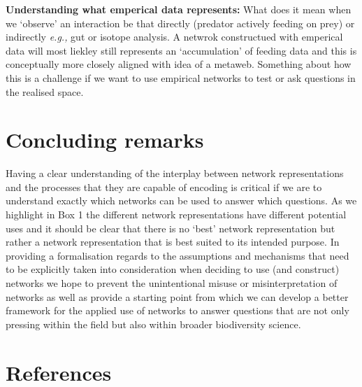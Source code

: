 \documentclass[
]{article}
\begin{document}
\textbf{Understanding what emperical data represents:} What does it mean
when we `observe' an interaction be that directly (predator actively
feeding on prey) or indirectly \emph{e.g.,} gut or isotope analysis. A
netwrok constructued with emperical data will most liekley still
represents an `accumulation' of feeding data and this is conceptually
more closely aligned with idea of a metaweb. Something about how this is
a challenge if we want to use empirical networks to test or ask
questions in the realised space.

\section{Concluding remarks}\label{concluding-remarks}

Having a clear understanding of the interplay between network
representations and the processes that they are capable of encoding is
critical if we are to understand exactly which networks can be used to
answer which questions. As we highlight in Box 1 the different network
representations have different potential uses and it should be clear
that there is no `best' network representation but rather a network
representation that is best suited to its intended purpose. In providing
a formalisation regards to the assumptions and mechanisms that need to
be explicitly taken into consideration when deciding to use (and
construct) networks we hope to prevent the unintentional misuse or
misinterpretation of networks as well as provide a starting point from
which we can develop a better framework for the applied use of networks
to answer questions that are not only pressing within the field but also
within broader biodiversity science.

\section*{References}\label{references}
\end{document}
